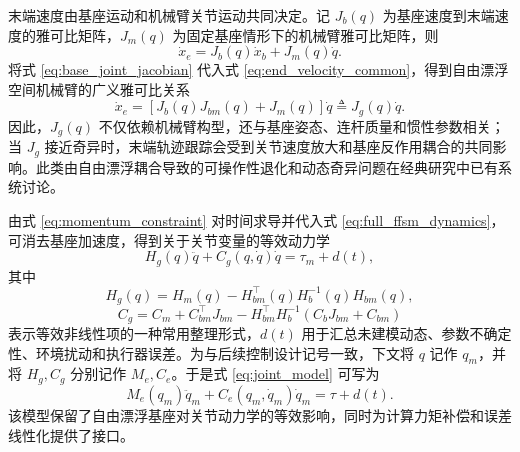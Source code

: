 末端速度由基座运动和机械臂关节运动共同决定。记 \(J_b(q)\) 为基座速度到末端速度的雅可比矩阵，\(J_m(q)\) 为固定基座情形下的机械臂雅可比矩阵，则
\begin{equation}
\dot x_e=J_b(q)\dot x_b+J_m(q)\dot q.
\label{eq:end_velocity_common}
\end{equation}
将式 \eqref{eq:base_joint_jacobian} 代入式 \eqref{eq:end_velocity_common}，得到自由漂浮空间机械臂的广义雅可比关系
\begin{equation}
\dot x_e=\left[J_b(q)J_{bm}(q)+J_m(q)\right]\dot q
\triangleq J_g(q)\dot q.
\label{eq:generalized_jacobian}
\end{equation}
因此，\(J_g(q)\) 不仅依赖机械臂构型，还与基座姿态、连杆质量和惯性参数相关；当 \(J_g\) 接近奇异时，末端轨迹跟踪会受到关节速度放大和基座反作用耦合的共同影响。此类由自由漂浮耦合导致的可操作性退化和动态奇异问题在经典研究中已有系统讨论\cite{papadopoulos1993}。

由式 \eqref{eq:momentum_constraint} 对时间求导并代入式 \eqref{eq:full_ffsm_dynamics}，可消去基座加速度，得到关于关节变量的等效动力学
\begin{equation}
H_g(q)\ddot q+C_g(q,\dot q)\dot q=\tau_m+d(t),
\label{eq:joint_model}
\end{equation}
其中
\begin{equation}
H_g(q)=H_m(q)-H_{bm}^\top(q)H_b^{-1}(q)H_{bm}(q),
\label{eq:generalized_inertia}
\end{equation}
\[
C_g=C_m+C_{bm}^\top J_{bm}
-H_{bm}^\top H_b^{-1}\left(C_bJ_{bm}+C_{bm}\right)
\]
表示等效非线性项的一种常用整理形式，\(d(t)\) 用于汇总未建模动态、参数不确定性、环境扰动和执行器误差。为与后续控制设计记号一致，下文将 \(q\) 记作 \(q_m\)，并将 \(H_g,C_g\) 分别记作 \(M_e,C_e\)。于是式 \eqref{eq:joint_model} 可写为
\[
M_e(q_m)\ddot q_m+C_e(q_m,\dot q_m)\dot q_m=\tau+d(t).
\]
该模型保留了自由漂浮基座对关节动力学的等效影响，同时为计算力矩补偿和误差线性化提供了接口。
